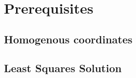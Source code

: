 \section{Prerequisites}

\subsection{Homogenous coordinates}



\subsection{Least Squares Solution}
